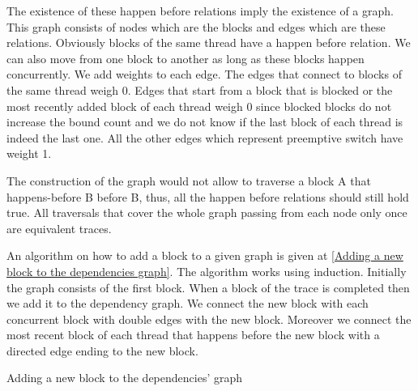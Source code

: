 The existence of these happen before relations imply the existence of a graph. This graph consists of nodes which are the blocks and edges which are these
relations. Obviously blocks of the same thread have a happen before relation. We can also move from one block to another as long as these blocks happen
concurrently. We add weights to each edge. The edges that connect to blocks of the same thread weigh 0. Edges that start from a block that 
is blocked or the most recently added block of each thread weigh 0 since blocked blocks do not increase the bound count and we do not know if the last block of
each thread is indeed the last one. All the other edges which represent preemptive switch have weight 1.

The construction of the graph would not allow to traverse a block A that happens-before B before B, thus, all the happen before relations should still hold true.
All traversals that cover the whole graph passing from each node only once are equivalent traces.

\noindent An algorithm on how to add a block to a given graph is given at \ref{Adding a new block to the dependencies graph}. The algorithm works using induction.
Initially the graph consists of the first block. When a block of the trace is completed then we add it to the dependency graph. We connect the new block with each 
concurrent block with double edges with the new block. Moreover we connect the most recent block of each thread that happens before the new block with a directed edge
ending to the new block. 

\begin{algorithm}[H]
    \caption{Adding a new block to the dependencies' graph}
    \label{Adding a new block to the dependencies graph}
\end{algorithm}


